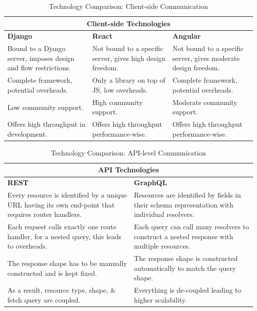 \begin{table}[H]
\begin{tabular}{ @{}|p{5cm}|p{5cm}|p{5cm}|  }
 \hline
 \multicolumn{3}{|c|}{\textbf{Client-side Technologies}} \\
 \hline
 \textbf{Django} & \textbf{React} & \textbf{Angular} \\
 \hline
 Bound to a Django server, imposes design and flow restrictions.  & Not bound to a specific server, gives high design freedom.  & Not bound to a specific server, gives moderate design freedom.\\
  \hline
Complete framework, potential overheads. & Only a library on top of JS, low overheads.  & Complete framework, potential overheads.\\
 \hline
 Low community support. &  High community support. & Moderate community support. \\
  \hline
Offers high throughput in development. & Offers high throughput performance-wise. & Offers high throughput performance-wise.\\
 \hline
\end{tabular}
\caption{Technology Comparison: Client-side Communication}
\label{table:tech-client}
\end{table}

\begin{table}[H]
\begin{tabular}{ @{}|p{7cm}|p{7cm}|  }
 \hline
 \multicolumn{2}{|c|}{\textbf{API Technologies}} \\
 \hline
 \textbf{REST} & \textbf{GraphQL} \\
 \hline
 Every resource is identified by a unique URL having its own end-point that requires router handlers.  & Resources are identified by fields in their schema representation with individual resolvers.\\
 \hline
 Each request calls exactly one route handler, for a nested query, this leads to overheads. & Each query can call many resolvers to construct a nested response with multiple resources. \\ 
 \hline
 The response shape has to be manually constructed and is kept fixed. &  The response shape is constructed automatically to match the query shape.  \\
  \hline
 As a result, resource type, shape, \& fetch query are coupled.  & Everything is de-coupled leading to higher scalability.\\
 \hline
\end{tabular}
\caption{Technology Comparison: API-level Communication}
\label{table:tech-api}
\end{table}

